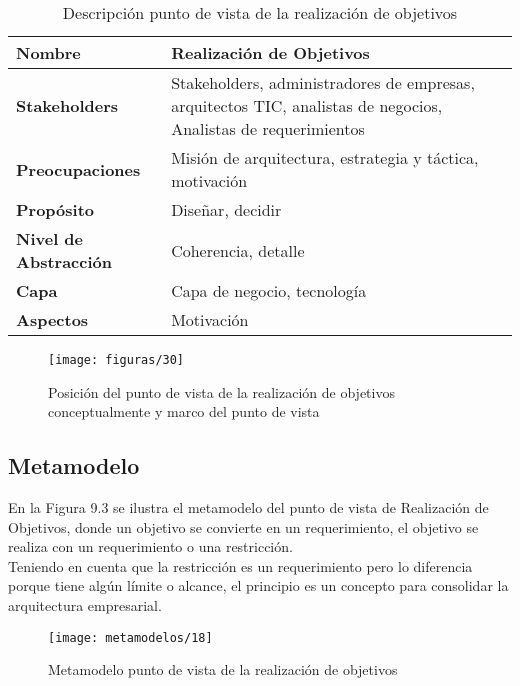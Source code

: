    \begin{table}[H]
   	\centering
   	\begin{tabular}{p{3.7cm}p{8cm}}
   		\hline
   		\rowcolor[HTML]{0073a1}
   		{\color[HTML]{FFFFFF} \textbf{Nombre}} & {\color[HTML]{FFFFFF} \textbf{Realización de Objetivos}} \\
   		\hline
   		\textbf{Stakeholders} & Stakeholders, administradores de empresas, arquitectos TIC, analistas de negocios, Analistas de requerimientos \\
   		\textbf{Preocupaciones} & Misión de arquitectura, estrategia y táctica, motivación \\
   		\textbf{Propósito} & Diseñar, decidir \\
   		\textbf{Nivel de Abstracción} & Coherencia, detalle \\
   		\textbf{Capa} & Capa de negocio, tecnología \\
   		\textbf{Aspectos} & Motivación \\
   		\bottomrule
   	\end{tabular}
   	\captionsetup{width=.95\textwidth}
   	\caption{Descripción punto de vista de la realización de objetivos}
   	\label{tabla21}
   \end{table}
   
   \begin{figure}[H]
   	\centering
   	\texttt{[image: figuras/30]}
   	\captionsetup{width=.95\textwidth}
   	\caption{Posición del punto de vista de la realización de objetivos conceptualmente y marco del punto de vista}
   	\label{figura30}
   \end{figure}
   
   \subsection{Metamodelo}
   En la Figura 9.3 se ilustra el metamodelo del punto de vista de Realización de Objetivos, donde un objetivo se convierte en un requerimiento, el objetivo se realiza con un requerimiento o una restricción. \\
   
   Teniendo en cuenta que la restricción es un requerimiento pero lo diferencia porque tiene algún límite o alcance, el principio es un concepto para consolidar la arquitectura empresarial.
   
   \begin{figure}[H]
   	\centering
   	\texttt{[image: metamodelos/18]}
   	\captionsetup{width=.95\textwidth}
   	\caption{Metamodelo punto de vista de la realización de objetivos}
   	\label{metamodelo18}
   \end{figure}
   
